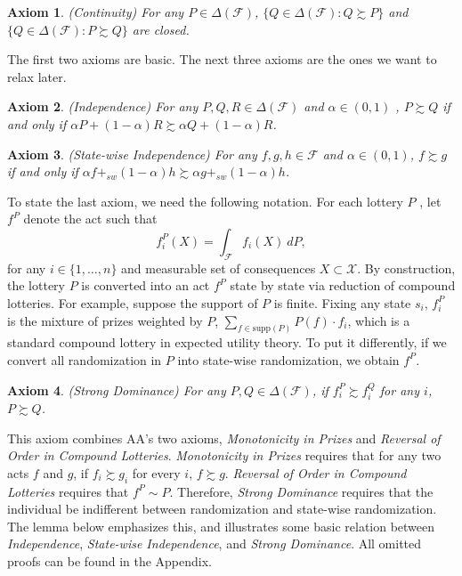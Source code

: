 \documentclass[12pt, notitlepage]{article}
\newtheorem{axiom}{Axiom}
\begin{document}
\begin{axiom}
(Continuity) For any $P\in \Delta (\mathcal{F})$, $\{Q\in \Delta (\mathcal{F}%
):Q\succsim P\}$ and $\{Q\in \Delta (\mathcal{F}):P\succsim Q\}$ are closed.
\end{axiom}

The first two axioms are basic. The next three axioms are the ones we want
to relax later.

\begin{axiom}
(Independence) For any $P,Q,R\in \Delta (\mathcal{F})$ and $\alpha \in (0,1)$%
, $P\succsim Q$ if and only if $\alpha P+(1-\alpha )R\succsim \alpha
Q+(1-\alpha )R$.
\end{axiom}

\begin{axiom}
(State-wise Independence) For any $f,g,h\in \mathcal{F}$ and $\alpha \in
(0,1)$, $f\succsim g$ if and only if $\alpha f+_{sw}(1-\alpha )h\succsim
\alpha g+_{sw}(1-\alpha )h$.
\end{axiom}

To state the last axiom, we need the following notation. For each lottery $P$%
, let $f^{P}$ denote the act such that%
\begin{equation}
f_{i}^{P}(X)=\int_{\mathcal{F}}f_{i}(X)~dP,  \label{projection}
\end{equation}%
for any $i\in \{1,\dots ,n\}$ and measurable set of consequences $X\subset 
\mathcal{X}$. By construction, the lottery $P$ is converted into an act $%
f^{P}$ state by state via reduction of compound lotteries. For example,
suppose the support of $P$ is finite. Fixing any state $s_{i}$, $f_{i}^{P}$
is the mixture of prizes weighted by $P$, $\sum_{f\in \text{supp}%
(P)}P(f)\cdot f_{i}$, which is a standard compound lottery in expected
utility theory. To put it differently, if we convert all randomization in $P$
into state-wise randomization, we obtain $f^{P}$.

\begin{axiom}
(Strong Dominance) For any $P,Q\in \Delta (\mathcal{F})$, if $%
f_{i}^{P}\succsim f_{i}^{Q}$ for any $i$, $P\succsim Q$.
\end{axiom}

This axiom combines AA's two axioms, \textit{Monotonicity in Prizes} and 
\textit{Reversal of Order in Compound Lotteries}. \textit{Monotonicity in
Prizes} requires that for any two acts $f$ and $g$, if $f_{i}\succsim g_{i}$
for every $i$, $f\succsim g$. \textit{Reversal of Order in Compound Lotteries%
} requires that $f^{P}\sim P$. Therefore, \textit{Strong Dominance} requires
that the individual be indifferent between randomization and state-wise
randomization. The lemma below emphasizes this, and illustrates some basic
relation between \textit{Independence}, \textit{State-wise Independence},
and \textit{Strong Dominance}. All omitted proofs can be found in the
Appendix.
\end{document}
